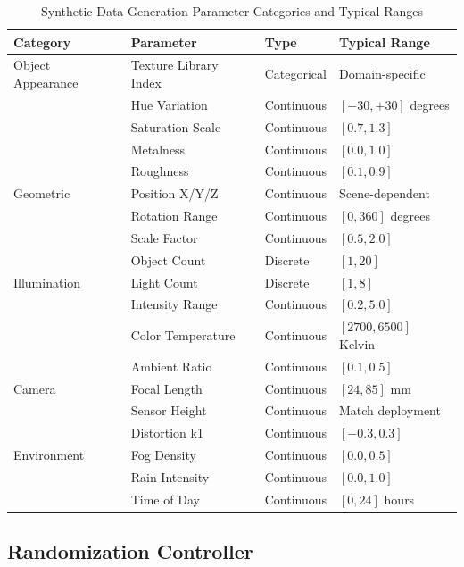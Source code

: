 \begin{table}[htbp]
\centering
\caption{Synthetic Data Generation Parameter Categories and Typical Ranges}
\label{tab:parameter_space}
\begin{tabular}{p{3cm}p{4cm}p{3cm}p{4cm}}
\toprule
\textbf{Category} & \textbf{Parameter} & \textbf{Type} & \textbf{Typical Range} \\
\midrule
Object Appearance & Texture Library Index & Categorical & Domain-specific \\
 & Hue Variation & Continuous & $[-30, +30]$ degrees \\
 & Saturation Scale & Continuous & $[0.7, 1.3]$ \\
 & Metalness & Continuous & $[0.0, 1.0]$ \\
 & Roughness & Continuous & $[0.1, 0.9]$ \\
\addlinespace
Geometric & Position X/Y/Z & Continuous & Scene-dependent \\
 & Rotation Range & Continuous & $[0, 360]$ degrees \\
 & Scale Factor & Continuous & $[0.5, 2.0]$ \\
 & Object Count & Discrete & $[1, 20]$ \\
\addlinespace
Illumination & Light Count & Discrete & $[1, 8]$ \\
 & Intensity Range & Continuous & $[0.2, 5.0]$ \\
 & Color Temperature & Continuous & $[2700, 6500]$ Kelvin \\
 & Ambient Ratio & Continuous & $[0.1, 0.5]$ \\
\addlinespace
Camera & Focal Length & Continuous & $[24, 85]$ mm \\
 & Sensor Height & Continuous & Match deployment \\
 & Distortion k1 & Continuous & $[-0.3, 0.3]$ \\
\addlinespace
Environment & Fog Density & Continuous & $[0.0, 0.5]$ \\
 & Rain Intensity & Continuous & $[0.0, 1.0]$ \\
 & Time of Day & Continuous & $[0, 24]$ hours \\
\bottomrule
\end{tabular}
\end{table}

\subsection{Randomization Controller}

